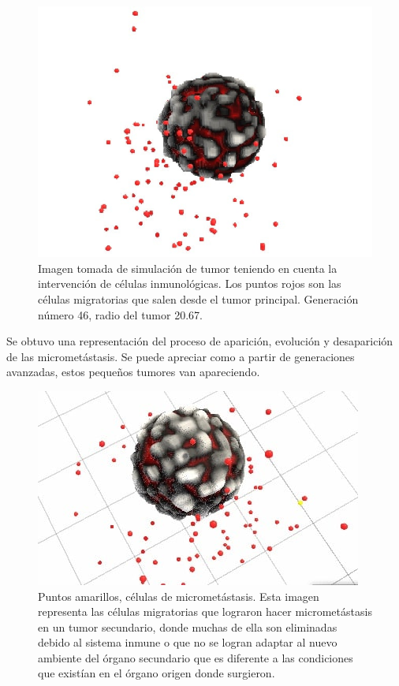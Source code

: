 \documentclass[12pt]{amsart}
\begin{document}
\begin{figure}[htb]
\centering
\includegraphics[scale=0.7]{img/inm.jpg}
\caption{Imagen tomada de simulaci\'on de tumor teniendo en cuenta la intervenci\'on de c\'elulas inmunol\'ogicas. Los puntos rojos son las c\'elulas migratorias que salen desde el tumor principal. Generaci\'on n\'umero 46, radio del tumor 20.67.}
\end{figure}


Se obtuvo una representaci\'on del proceso de aparici\'on, evoluci\'on y desaparici\'on de las micromet\'astasis. Se puede apreciar como a partir de generaciones avanzadas, estos pequeños tumores van apareciendo.\\

\begin{figure}[htb]
\centering
\includegraphics[scale=0.7]{img/met.jpg}
\caption{Puntos amarillos, c\'elulas de micromet\'astasis. Esta imagen representa las c\'elulas migratorias que lograron hacer micromet\'astasis en un tumor secundario, donde muchas de ella son eliminadas  debido al sistema inmune o que no se logran adaptar al nuevo ambiente del \'organo secundario que es diferente a las condiciones que exist\'ian en el \'organo origen donde surgieron.}
\end{figure}
\end{document}
